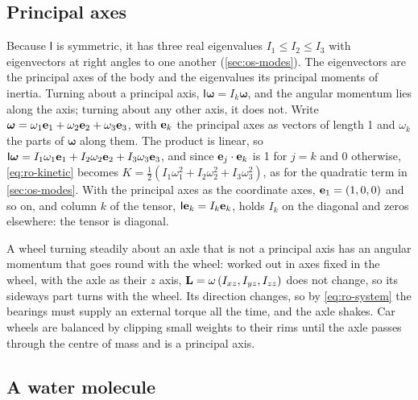 \subsection*{Principal axes}

Because $\mathsf{I}$ is symmetric, it has three real eigenvalues $I_1 \le
I_2 \le I_3$ with eigenvectors at right angles to one another
(\cref{sec:os-modes}). The eigenvectors are the principal axes of the
body and the eigenvalues its principal moments of inertia. Turning about
a principal axis, $\mathsf{I}\boldsymbol{\omega} = I_k\boldsymbol{\omega}$,
and the angular momentum lies along the axis; turning about any other axis,
it does not. Write $\boldsymbol{\omega} = \omega_1\bm{\mathrm{e}}_1 + \omega_2\bm{\mathrm{e}}_2 +
\omega_3\bm{\mathrm{e}}_3$, with $\bm{\mathrm{e}}_k$ the principal axes as vectors of length
1 and $\omega_k$ the parts of $\boldsymbol{\omega}$ along them. The product
is linear, so $\mathsf{I}\boldsymbol{\omega} = I_1\omega_1\bm{\mathrm{e}}_1 +
I_2\omega_2\bm{\mathrm{e}}_2 + I_3\omega_3\bm{\mathrm{e}}_3$, and since $\bm{\mathrm{e}}_j\cdot
\bm{\mathrm{e}}_k$ is 1 for $j = k$ and 0 otherwise, \cref{eq:ro-kinetic} becomes
$K = \frac12(I_1\omega_1^2 + I_2\omega_2^2 + I_3\omega_3^2)$, as for the
quadratic term in \cref{sec:os-modes}. With the principal axes as the
coordinate axes, $\bm{\mathrm{e}}_1 = (1, 0, 0)$ and so on, and column $k$ of the
tensor, $\mathsf{I}\bm{\mathrm{e}}_k = I_k\bm{\mathrm{e}}_k$, holds $I_k$ on the diagonal
and zeros elsewhere: the tensor is diagonal.

A wheel turning steadily about an axle that is not a principal axis has
an angular momentum that goes round with the wheel: worked out in axes
fixed in the wheel, with the axle as their $z$ axis, $\bm{\mathrm{L}} =
\omega\,(I_{xz}, I_{yz}, I_{zz})$ does not change, so its sideways part
turns with the wheel. Its direction changes, so by \cref{eq:ro-system}
the bearings must supply an external torque all the time, and the axle
shakes. Car wheels are balanced by clipping small weights to
their rims until the axle passes through the centre of mass and is a
principal axis.

\subsection*{A water molecule}

